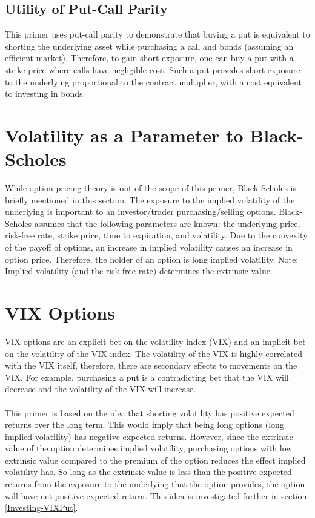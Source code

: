 \documentclass[11pt, oneside]{book}
\begin{document}
\subsection{Utility of Put-Call Parity} \label{Options-PutCall-Utility}
This primer uses put-call parity to demonstrate that buying a put is equivalent to shorting the underlying asset while purchasing a call and bonds (assuming an efficient market). Therefore, to gain short exposure, one can buy a put with a strike price where calls have negligible cost. Such a put provides short exposure to the underlying proportional to the contract multiplier, with a cost equivalent to investing in bonds.

\section{Volatility as a Parameter to Black-Scholes} \label{Options-BSM}
While option pricing theory is out of the scope of this primer, Black-Scholes is briefly mentioned in this section. The exposure to the implied volatility of the underlying is important to an investor/trader purchasing/selling options. Black-Scholes assumes that the following parameters are known: the underlying price, risk-free rate, strike price, time to expiration, and volatility. Due to the convexity of the payoff of options, an increase in implied volatility causes an increase in option price. Therefore, the holder of an option is long implied volatility. Note: Implied volatility (and the risk-free rate) determines the extrinsic value.

\section{VIX Options} \label{Options-VIXOpts}
VIX options are an explicit bet on the volatility index (VIX) and an implicit bet on the volatility of the VIX index. The volatility of the VIX is highly correlated with the VIX itself, therefore, there are secondary effects to movements on the VIX. For example, purchasing a put is a contradicting bet that the VIX will decrease and the volatility of the VIX will increase.\\
\\
This primer is based on the idea that shorting volatility has positive expected returns over the long term. This would imply that being long options (long implied volatility) has negative expected returns. However, since the extrinsic value of the option determines implied volatility, purchasing options with low extrinsic value compared to the premium of the option reduces the effect implied volatility has. So long as the extrinsic value is less than the positive expected returns from the exposure to the underlying that the option provides, the option will have net positive expected return. This idea is investigated further in section \ref{Investing-VIXPut}.
\end{document}
